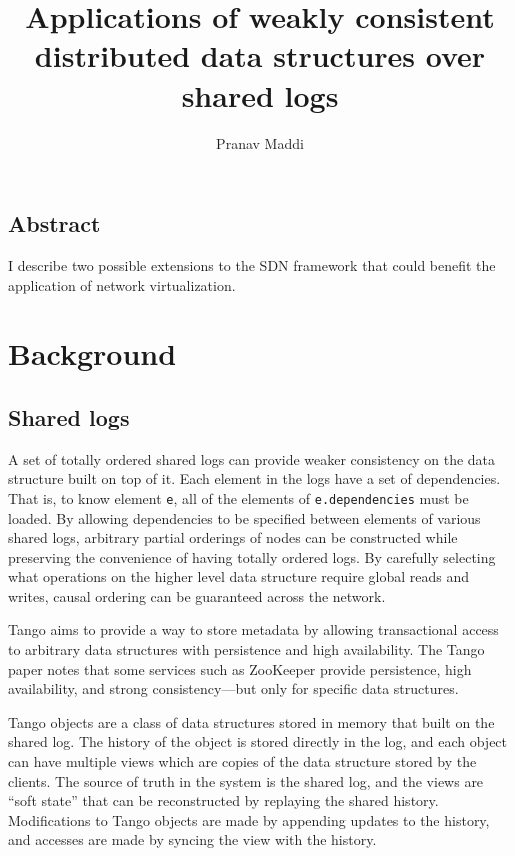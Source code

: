 \documentclass[letterpaper,twocolumn,10pt]{article}
\begin{document}
\title{\Large Applications of weakly consistent distributed data structures over shared logs}

\author{Pranav Maddi}

\date{}
\maketitle

\tableofcontents

\subsection*{Abstract}

I describe two possible extensions to the SDN framework that could benefit the application of network virtualization.

\section{Background}

\subsection{Shared logs}

A set of totally ordered shared logs can provide weaker consistency on the data structure built on top of it. Each element in the logs have a set of dependencies. That is, to know element \verb_e_, all of the elements of \verb_e.dependencies_ must be loaded.  By allowing dependencies to be specified between elements of various shared logs, arbitrary partial orderings of nodes can be constructed while preserving the convenience of having totally ordered logs. By carefully selecting what operations on the higher level data structure require global reads and writes, causal ordering can be guaranteed across the network.

Tango \cite{Tango} aims to provide a way to store metadata by allowing transactional access to arbitrary data structures with persistence and high availability. The Tango paper notes that some services such as ZooKeeper provide persistence, high availability, and strong consistency---but only for specific data structures.

Tango objects are a class of data structures stored in memory that built on the shared log. The history of the object is stored directly in the log, and each object can have multiple views which are copies of the data structure stored by the clients. The source of truth in the system is the shared log, and the views are ``soft state'' that can be reconstructed by replaying the shared history. Modifications to Tango objects are made by appending updates to the history, and accesses are made by syncing the view with the history.
\end{document}
